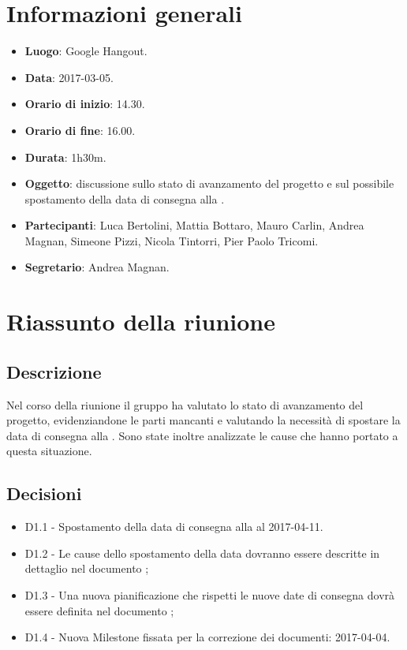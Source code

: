 \documentclass[a4paper,titlepage]{article}
\begin{document}
\maketitle
\begin{diario}
\end{diario}
\newpage
\tableofcontents

\newpage
\section{Informazioni generali}
\label{sec:Informazioni}

\begin{itemize}
  \item \textbf{Luogo}: Google Hangout.
  \item \textbf{Data}: 2017-03-05.
  \item \textbf{Orario di inizio}: 14.30.
  \item \textbf{Orario di fine}: 16.00.
  \item \textbf{Durata}: 1h30m.
  \item \textbf{Oggetto}: discussione sullo stato di avanzamento del progetto e sul possibile spostamento della data di consegna alla \RP{}.
  \item \textbf{Partecipanti}: Luca Bertolini, Mattia Bottaro, Mauro Carlin, Andrea Magnan, Simeone Pizzi, Nicola Tintorri, Pier Paolo Tricomi.
  \item \textbf{Segretario}: Andrea Magnan.

\end{itemize}
\section{Riassunto della riunione}
\label{sec:RiassuntoRiunione}
 \subsection{Descrizione}
Nel corso della riunione il gruppo \GRUPPO{} ha valutato lo stato di avanzamento del progetto, evidenziandone le parti mancanti e valutando la necessità di spostare la data di consegna alla \RP{}. Sono state inoltre analizzate le cause che hanno portato a questa situazione.

 \subsection{Decisioni}
 \begin{itemize}
 \item D1.1 - Spostamento della data di consegna alla \RP{} al 2017-04-11.
 \item D1.2 - Le cause dello spostamento della data dovranno essere descritte in dettaglio nel documento \PPdocRP{};
  \item D1.3 - Una nuova pianificazione che rispetti le nuove date di consegna dovrà essere definita nel documento \PPdocRP{};
  \item D1.4 - Nuova Milestone fissata per la correzione dei documenti: 2017-04-04.
 \end{itemize}
\end{document}
